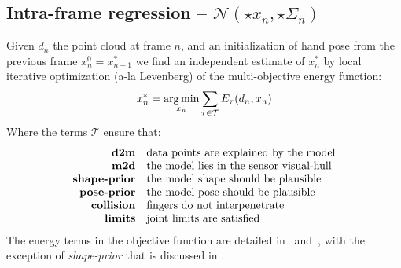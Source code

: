  



\subsection{Intra-frame regression -- $\mathcal{N}(\star{x}_n, \star{\Sigma}_n)$}
\label{sec:independent}
% 
Given $d_n$ the point cloud at frame $n$, and an initialization of hand pose from the previous frame $x_n^0 = x_{n - 1}^*$ we find an independent estimate of $x_n^*$ by local iterative optimization (a-la Levenberg) of the multi-objective energy function:
% 
\begin{equation}
x_n^* = \operatorname*{arg\,min}_{x_n} \sum_{\tau \in \mathcal{T}} E_{\tau}(d_n, x_n) 
\label{eq:energies}
\end{equation}
% 
Where the terms $\mathcal{T}$ ensure that:
%
\begin{equation*}
\setlength{\jot}{0pt}
\begin{aligned}
\text{\textbf{d2m}} & \quad \text{data points are explained by the model} \\ 
\text{\textbf{m2d}} & \quad \text{the model lies in the sensor visual-hull} \\
\text{\textbf{shape-prior}} & \quad \text{the model shape should be plausible} \\
\text{\textbf{pose-prior}} & \quad \text{the model pose should be plausible} \\
\text{\textbf{collision}} & \quad \text{fingers do not interpenetrate} \\
\text{\textbf{limits}} & \quad \text{joint limits are satisfied}
\end{aligned}
\end{equation*}
The energy terms in the objective function are detailed in~\cite{tkach2016sphere} and~\cite{htrack}, with the exception of \emph{shape-prior} that is discussed in .

